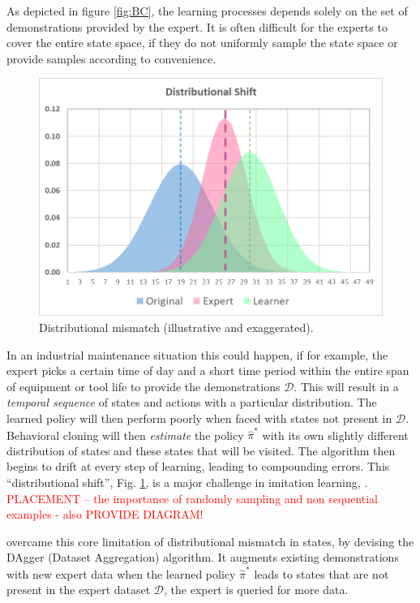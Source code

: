 \documentclass{article}
\begin{document}
As depicted in figure \ref{fig:BC}, the learning processes depends solely on the set of demonstrations provided by the expert. It is often difficult for the experts to cover the entire state space, if they do not uniformly sample the state space or provide samples according to convenience.

\begin{figure}[H]
\centering
\includegraphics[width=0.6\linewidth]{images/DistributionalShift.png}
\caption{Distributional mismatch (illustrative and exaggerated).}
\label{fig:DistribShift}
\end{figure}

In an industrial maintenance situation this could happen, if for example, the expert picks a certain time of day and a short time period within the entire span of equipment or tool life to provide the demonstrations $\mathcal{D}$.  This will result in a \textit{temporal sequence} of states and actions with a particular distribution. The learned policy will then perform poorly when faced with states not present in $\mathcal{D}$. Behavioral cloning will then \textit{estimate} the policy ${\hat{\pi}}^*$ with its own slightly different distribution of states and these states  that will be visited. The algorithm then begins to drift at every step of learning, leading to compounding errors. This ``distributional shift'', Fig. \ref{fig:DistribShift}, is a major challenge in imitation learning, \citep{yue2018imitation, stanford-lectures}. \textcolor{red}{PLACEMENT -- the importance of randomly sampling and non sequential examples - also PROVIDE DIAGRAM!} 

\cite{Dagger-Ross2010} overcame this core limitation of distributional mismatch in states, by devising the DAgger (Dataset Aggregation) algorithm. It augments existing demonstrations with new expert data when the learned policy ${\hat{\pi}}^*$ leads to states that are not present in the expert dataset $\mathcal{D}$, the expert is queried for more data.
\end{document}
